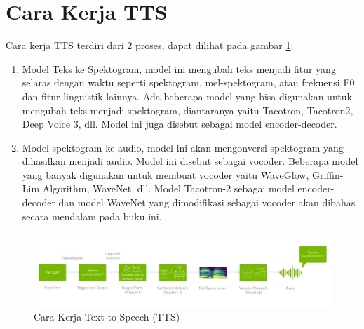 \section{Cara Kerja TTS}
Cara kerja TTS terdiri dari 2 proses, dapat dilihat pada gambar \ref{cara kerja}:
\begin{enumerate}
\item Model Teks ke Spektogram, model ini mengubah teks menjadi fitur yang selaras dengan waktu seperti spektogram, mel-spektogram, atau frekuensi F0 dan fitur linguistik lainnya. Ada beberapa model yang bisa digunakan untuk mengubah teks menjadi spektogram, diantaranya yaitu Tacotron, Tacotron2, Deep Voice 3, dll. Model ini juga disebut sebagai model encoder-decoder.
\item Model spektogram ke audio, model ini akan mengonversi spektogram yang dihasilkan menjadi audio. Model ini disebut sebagai vocoder. Beberapa model yang banyak digunakan untuk membuat vocoder yaitu WaveGlow, Griffin-Lim Algorithm, WaveNet, dll.
Model Tacotron-2 sebagai model encoder-decoder dan model WaveNet yang dimodifikasi sebagai vocoder akan dibahas secara mendalam pada buku ini.
\end{enumerate}
\begin{figure}[H]
        \centerline{\includegraphics[scale=.40]{figures/cara_kerja_tts}}
        \caption{Cara Kerja Text to Speech (TTS)}
		\label{cara kerja}
\end{figure}
